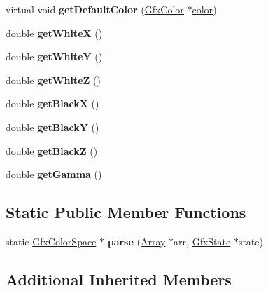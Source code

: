 \begin{DoxyCompactItemize}
virtual void {\bfseries get\+Default\+Color} (\hyperlink{struct_gfx_color}{Gfx\+Color} $\ast$\hyperlink{structcolor}{color})
\item 
\mbox{\label{class_gfx_cal_gray_color_space_a0f8af4fdb7290b6f1329fad23915fb28}} 
double {\bfseries get\+WhiteX} ()
\item 
\mbox{\label{class_gfx_cal_gray_color_space_a1674dd6636730d67638311fbff45062f}} 
double {\bfseries get\+WhiteY} ()
\item 
\mbox{\label{class_gfx_cal_gray_color_space_a18440a46a3868c12a99050fe62126704}} 
double {\bfseries get\+WhiteZ} ()
\item 
\mbox{\label{class_gfx_cal_gray_color_space_afb31b9829119b4d6fd53fd971e6293e0}} 
double {\bfseries get\+BlackX} ()
\item 
\mbox{\label{class_gfx_cal_gray_color_space_aaa2d649451041bb4b16a67fc9b2922e2}} 
double {\bfseries get\+BlackY} ()
\item 
\mbox{\label{class_gfx_cal_gray_color_space_a4ebeef3e9fe1f7103641317516fca3dd}} 
double {\bfseries get\+BlackZ} ()
\item 
\mbox{\label{class_gfx_cal_gray_color_space_acadc2b058d5b4169e90a49f2c8db2c35}} 
double {\bfseries get\+Gamma} ()
\end{DoxyCompactItemize}
\subsection*{Static Public Member Functions}
\begin{DoxyCompactItemize}
\item 
\mbox{\label{class_gfx_cal_gray_color_space_a023d1ef7c21dc2fc8a0bd545a629c43a}} 
static \hyperlink{class_gfx_color_space}{Gfx\+Color\+Space} $\ast$ {\bfseries parse} (\hyperlink{class_array}{Array} $\ast$arr, \hyperlink{class_gfx_state}{Gfx\+State} $\ast$state)
\end{DoxyCompactItemize}
\subsection*{Additional Inherited Members}


